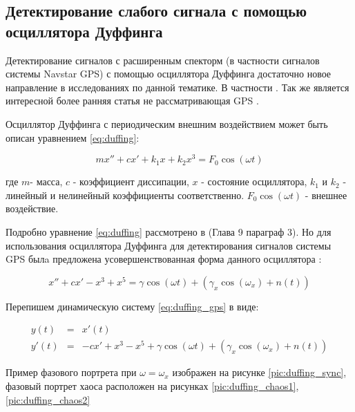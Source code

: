 \subsection{Детектирование слабого сигнала с помощью осциллятора Дуффинга}
\label{ssec:duffing}

Детектирование сигналов с расширенным спекторм (в частности сигналов системы Navstar GPS) с помощью осциллятора Дуффинга
достаточно новое направление в исследованиях по данной тематике. В частности
\cite{chaos_chen, chaos_cambridge, chaos_huang, chaos_song}. Так же является интересной более ранняя статья не рассматривающая GPS
\cite{chaos_wang}.

Осциллятор Дуффинга с периодическим внешним воздействием может быть описан уравнением \ref{eq:duffing}:

\begin{center}
\begin{equation}
	\label{eq:duffing}
	mx'' + cx' + k_{1}x + k_{2}x^3 = F_{0}\cos(\omega{t})
\end{equation}
\end{center}

где
$m$- масса,
$c$ - коэффициент диссипации,
$x$ - состояние осциллятора,
$k_1$ и $k_2$ - линейный и нелинейный коэффициенты соответственно.
$F_{0}\cos(\omega{t})$ - внешнее воздействие.

Подробно уравнение \ref{eq:duffing} рассмотрено в \cite{chaos_neimark_landa} (Глава 9 параграф 3). Но
для использования осциллятора Дуффинга для детектирования сигналов системы GPS былa предложена
усовершенствованная форма данного осциллятора \cite{chaos_song, chaos_chen}:

\begin{center}
\begin{equation}
	\label{eq:duffing_gps}
	x'' +cx' - x^3 + x^5 = \gamma\cos(\omega{t}) + (\gamma_{x}\cos(\omega_{x}) + n(t))
\end{equation}
\end{center}

Перепишем динамическую систему \ref{eq:duffing_gps} в виде:
\begin{center}
\begin{eqnarray}
	\label{eq:duffing_gps_2}
	y(t) & = & x'(t) \\
	y'(t) & = & -cx' + x^3 - x^5 + \gamma\cos(\omega{t}) + (\gamma_{x}\cos(\omega_{x}) + n(t))
\end{eqnarray}
\end{center}

Пример фазового портрета при ${\omega=\omega_{x}}$ изображен на рисунке \ref{pic:duffing_sync},
фазовый портрет хаоса расположен на рисунках \ref{pic:duffing_chaos1}, \ref{pic:duffing_chaos2}

